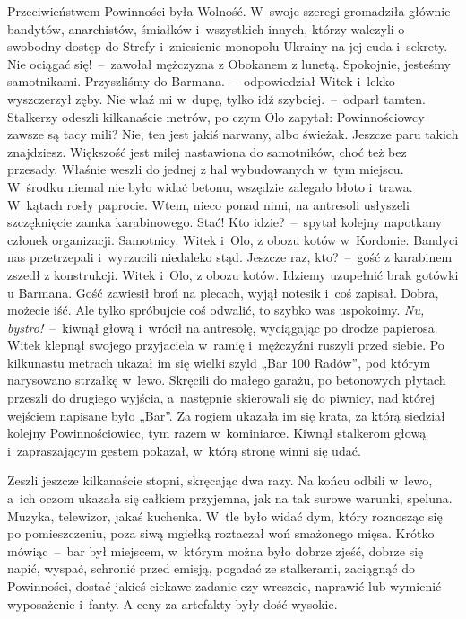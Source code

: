 \documentclass[../MAIN.tex]{subfiles}
\begin{document}
Przeciwieństwem Powinności była Wolność. W~swoje szeregi gromadziła głównie bandytów, anarchistów, śmiałków i~wszystkich innych, którzy walczyli o swobodny dostęp do Strefy i~zniesienie monopolu Ukrainy na jej cuda i~sekrety.
\sx Nie ociągać się!~--~zawołał mężczyzna z Obokanem z lunetą.
\xx Spokojnie, jesteśmy samotnikami. Przyszliśmy do Barmana.~--~odpowiedział Witek i~lekko wyszczerzył zęby.
\xx Nie właź mi w~dupę, tylko idź szybciej.~--~odparł tamten.
\qm
Stalkerzy odeszli kilkanaście metrów, po czym Olo zapytał:
\sx Powinnościowcy zawsze są tacy mili?
\xx Nie, ten jest jakiś narwany, albo świeżak. Jeszcze paru takich znajdziesz. Większość jest milej nastawiona do samotników, choć też bez przesady.
\qm
Właśnie weszli do jednej z hal wybudowanych w~tym miejscu. W~środku niemal nie było widać betonu, wszędzie zalegało błoto i~trawa. W~kątach rosły paprocie. Wtem, nieco ponad nimi, na antresoli usłyszeli szczęknięcie zamka karabinowego.
\sx Stać! Kto idzie?~--~spytał kolejny napotkany członek organizacji.
\xx Samotnicy. Witek i~Olo, z obozu kotów w~Kordonie. Bandyci nas przetrzepali i~wyrzucili niedaleko stąd.
\xx Jeszcze raz, kto?~--~gość z karabinem zszedł z konstrukcji.
\xx Witek i~Olo, z obozu kotów. Idziemy uzupełnić brak gotówki u Barmana.
\qm
Gość zawiesił broń na plecach, wyjął notesik i~coś zapisał.
\sx Dobra, możecie iść. Ale tylko spróbujcie coś odwalić, to szybko was uspokoimy. \textit{Nu, bystro!}~--~kiwnął głową i~wrócił na antresolę, wyciągając po drodze papierosa.
\qm
Witek klepnął swojego przyjaciela w~ramię i~mężczyźni ruszyli przed siebie. Po kilkunastu metrach ukazał im się wielki szyld „Bar 100 Radów”, pod którym narysowano strzałkę w~lewo. Skręcili do małego garażu, po betonowych płytach przeszli do drugiego wyjścia, a~następnie skierowali się do piwnicy, nad której wejściem napisane było „Bar”. Za rogiem ukazała im się krata, za którą siedział kolejny Powinnościowiec, tym razem w~kominiarce. Kiwnął stalkerom głową i~zapraszającym gestem pokazał, w~którą stronę winni się udać.

Zeszli jeszcze kilkanaście stopni, skręcając dwa razy. Na końcu odbili w~lewo, a~ich oczom ukazała się całkiem przyjemna, jak na tak surowe warunki, speluna. Muzyka, telewizor, jakaś kuchenka. W~tle było widać dym, który roznosząc się po pomieszczeniu, poza siwą mgiełką roztaczał woń smażonego mięsa. Krótko mówiąc~--~bar był miejscem, w~którym można było dobrze zjeść, dobrze się napić, wyspać, schronić przed emisją, pogadać ze stalkerami, zaciągnąć do Powinności, dostać jakieś ciekawe zadanie czy wreszcie, naprawić lub wymienić wyposażenie i~fanty. A ceny za artefakty były dość wysokie.
\end{document}
